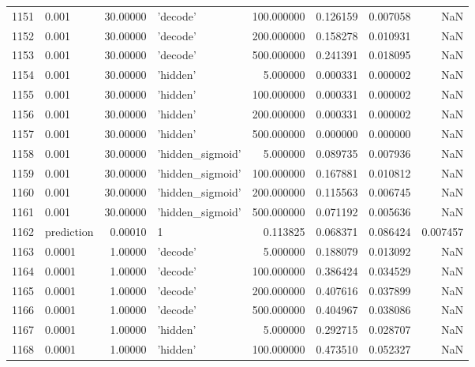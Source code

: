 \documentclass[10pt,a4paper]{article}
\begin{document}
\begin{tabular}{llrlrrrr}
1151 &       0.001 &  30.00000 &           'decode' &  100.000000 &  0.126159 &  0.007058 &       NaN \\
1152 &       0.001 &  30.00000 &           'decode' &  200.000000 &  0.158278 &  0.010931 &       NaN \\
1153 &       0.001 &  30.00000 &           'decode' &  500.000000 &  0.241391 &  0.018095 &       NaN \\
1154 &       0.001 &  30.00000 &           'hidden' &    5.000000 &  0.000331 &  0.000002 &       NaN \\
1155 &       0.001 &  30.00000 &           'hidden' &  100.000000 &  0.000331 &  0.000002 &       NaN \\
1156 &       0.001 &  30.00000 &           'hidden' &  200.000000 &  0.000331 &  0.000002 &       NaN \\
1157 &       0.001 &  30.00000 &           'hidden' &  500.000000 &  0.000000 &  0.000000 &       NaN \\
1158 &       0.001 &  30.00000 &   'hidden\_sigmoid' &    5.000000 &  0.089735 &  0.007936 &       NaN \\
1159 &       0.001 &  30.00000 &   'hidden\_sigmoid' &  100.000000 &  0.167881 &  0.010812 &       NaN \\
1160 &       0.001 &  30.00000 &   'hidden\_sigmoid' &  200.000000 &  0.115563 &  0.006745 &       NaN \\
1161 &       0.001 &  30.00000 &   'hidden\_sigmoid' &  500.000000 &  0.071192 &  0.005636 &       NaN \\
1162 &  prediction &   0.00010 &                  1 &    0.113825 &  0.068371 &  0.086424 &  0.007457 \\
1163 &      0.0001 &   1.00000 &           'decode' &    5.000000 &  0.188079 &  0.013092 &       NaN \\
1164 &      0.0001 &   1.00000 &           'decode' &  100.000000 &  0.386424 &  0.034529 &       NaN \\
1165 &      0.0001 &   1.00000 &           'decode' &  200.000000 &  0.407616 &  0.037899 &       NaN \\
1166 &      0.0001 &   1.00000 &           'decode' &  500.000000 &  0.404967 &  0.038086 &       NaN \\
1167 &      0.0001 &   1.00000 &           'hidden' &    5.000000 &  0.292715 &  0.028707 &       NaN \\
1168 &      0.0001 &   1.00000 &           'hidden' &  100.000000 &  0.473510 &  0.052327 &       NaN \\

\end{tabular}
\end{document}
